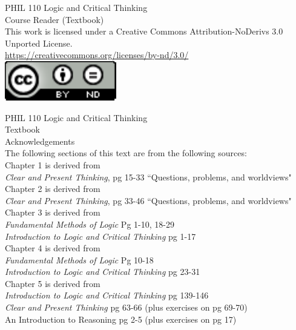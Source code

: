 \documentclass[twoside, openright]{book}
\begin{document}
\newpage
\thispagestyle{empty}
\vspace*{18pt}
\begin{center}
PHIL 110 Logic and Critical Thinking \\
Course Reader (Textbook) \\
This work is licensed under a Creative Commons Attribution-NoDerivs 3.0 Unported License. \\
\url{https://creativecommons.org/licenses/by-nd/3.0/} \\
\includegraphics[scale=.99]{cc-license.pdf}

\end{center}

\newpage
\thispagestyle{empty}
\vspace*{18pt}
PHIL 110 Logic and Critical Thinking \\
Textbook \\
Acknowledgements \\
The following sections of this text are from the following sources: \\

Chapter 1 is derived from \\ 
\emph{Clear and Present Thinking}, pg 15-33 ``Questions, problems, and worldviews" \\

Chapter 2 is derived from \\ 
\emph{Clear and Present Thinking}, pg 33-46 ``Questions, problems, and worldviews" \\

Chapter 3 is derived from \\
\emph{Fundamental Methods of Logic} Pg 1-10, 18-29 \\
\emph{Introduction to Logic and Critical Thinking} pg 1-17 \\

Chapter 4 is derived from \\
\emph{Fundamental Methods of Logic} Pg  10-18 \\
\emph{Introduction to Logic and Critical Thinking} pg 23-31 \\

Chapter 5 is derived from \\
\emph{Introduction to Logic and Critical Thinking} pg 139-146 \\
\emph{Clear and Present Thinking} pg 63-66 (plus exercises on pg 69-70) \\
An Introduction to Reasoning pg 2-5 (plus exercises on pg 17) \\
\end{document}

